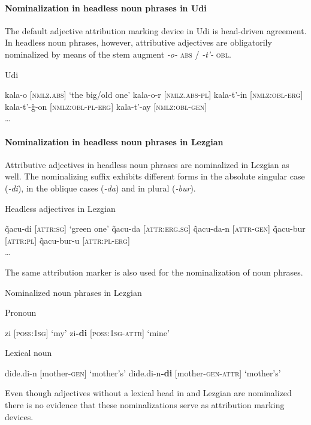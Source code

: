 \paragraph{Nominalization in headless noun phrases in Udi}
The default adjective attribution marking device in Udi is head-driven agreement. In headless noun phrases, however, attributive adjectives are obligatorily nominalized by means of the stem augment \textit{-o-} \textsc{abs} / \textit{-t'-} \textsc{obl}.
\begin{exe}
\ex \rm{Udi \citep[466]{schulze-furhoff1994}}
\begin{xlist}
\ex	kala-o		\rm{[\textsc{nmlz.abs}] ‘the big/old one’}
\ex	kala-o-r		\rm{[\textsc{nmlz.abs}-\textsc{pl}]}
\ex	kala-t'-in		\rm{[\textsc{nmlz:obl}-\textsc{erg}]}
\ex	kala-t'-ĝ-on	\rm{[\textsc{nmlz:obl}-\textsc{pl}-\textsc{erg}]}
\ex	kala-t'-ay		\rm{[\textsc{nmlz:obl}-\textsc{gen}]}\\
\dots
\end{xlist}
\end{exe}

\paragraph{Nominalization in headless noun phrases in Lezgian}
Attributive adjectives in headless noun phrases are nominalized in Lezgian as well. The nominalizing suffix exhibits different forms in the absolute singular case (\textit{-di}), in the oblique cases (\textit{-da}) and in plural (\textit{-bur}).
\begin{exe}
\ex \rm{Headless adjectives in Lezgian \citep[110]{haspelmath1993}}
\begin{xlist}
\ex	q̃acu-di		\rm{[\textsc{attr:sg}] ‘green one’}
\ex	q̃acu-da		\rm{[\textsc{attr:erg.sg}]}
\ex	q̃acu-da-n		\rm{[\textsc{attr}-\textsc{gen}]}
\ex	q̃acu-bur		\rm{[\textsc{attr:pl}]}
\ex	q̃acu-bur-u	\rm{[\textsc{attr:pl}-\textsc{erg}]}\\
\dots
\end{xlist}
\end{exe}
The same attribution marker is also used for the nominalization of noun phrases.
\begin{exe}
\ex \rm{Nominalized noun phrases in Lezgian \citep[110]{haspelmath1993}}
\begin{xlist}
\ex \rm{Pronoun} 
\begin{xlist}
\ex	zi					\rm{[\textsc{poss:1sg}] ‘my’}
\ex	zi\textbf{-di}			\rm{[\textsc{poss:1sg}-\textsc{attr}] ‘mine’}
\end{xlist}
\ex \rm{Lexical noun}
\begin{xlist}
\ex	dide.di-n				\rm{[mother-\textsc{gen}] ‘mother's’}
\ex 	dide.di-n\textbf{-di}		\rm{[mother-\textsc{gen}-\textsc{attr}] ‘mother's’}
\end{xlist}
\end{xlist}
\end{exe}
Even though adjectives without a lexical head in  and Lezgian are nominalized there is no evidence that these nominalizations serve as attribution marking devices.

